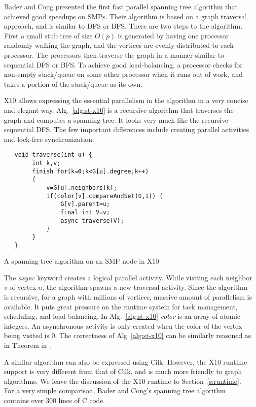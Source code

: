 Bader and Cong \cite{BC04a} presented the first fast parallel spanning tree algorithm that achieved good 
speedups on SMPs. Their algorithm is based on a graph traversal approach, and is similar to DFS or BFS. 
There are two steps to the algorithm. First a small stub tree of size $O(p)$ is generated by having one processor randomly walking the graph, and the vertices are evenly distributed to each processor.
The processors then traverse the graph in a manner similar to sequential DFS or BFS. 
To achieve good load-balancing, a processor checks for non-empty stack/queue on some other processor when it runs out of work, and takes a portion of the stack/queue as its own.

X10 allows expressing the essential parallelism in the algorithm in a very concise and elegant way. Alg.~\ref{alg:st-x10} is a recursive algorithm that traverses the graph and computes a spanning tree. It looks very much like the recursive sequential DFS. The few important differences include creating parallel activities and lock-free synchronization.  
\begin{algorithm}
\begin{verbatim} 
   void traverse(int u) {
        int k,v;
        finish for(k=0;k<G[u].degree;k++)
        {
            v=G[u].neighbors[k];
            if(color[v].compareAndSet(0,1)) {
                G[v].parent=u;
                final int V=v;
                async traverse(V);
            }
        }
   }
\end{verbatim}
\caption{A spanning tree algorithm on an SMP node in X10}
\label{alg:st-x10}
\end{algorithm}

The \emph{async} keyword creates a logical parallel activity. While visiting each neighbor $v$ of vertex $u$, the algorithm spawns a new traversal activity. Since the algorithm is recursive, for a graph with millions of vertices, massive amount of parallelism is available. It puts great pressure on the runtime system for task management, scheduling, and load-balancing. In Alg.~\ref{alg:st-x10} \emph{color} is an array of atomic integers. An asynchronous activity is only created when the color of the vertex being visited is 0. The correctness of Alg~\ref{alg:st-x10} can be similarly reasoned as in Theorem in \cite{BC04a}. 

A similar algorithm can also be expressed using Cilk. However, the X10 runtime support is very different from that of Cilk, and is much more friendly to graph algorithms. We leave the discussion of the X10 runtime to Section~\ref{s:runtime}. For a very simple comparison, Bader and Cong's spanning tree algorithm contains over 300 lines of C code.


